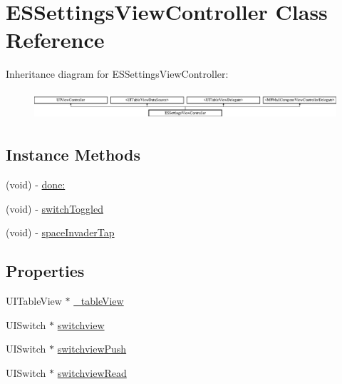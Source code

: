 \hypertarget{interface_e_s_settings_view_controller}{}\section{E\+S\+Settings\+View\+Controller Class Reference}
\label{interface_e_s_settings_view_controller}
Inheritance diagram for E\+S\+Settings\+View\+Controller\+:\begin{figure}[H]
\begin{center}
\leavevmode
\includegraphics[height=1.064639cm]{interface_e_s_settings_view_controller}
\end{center}
\end{figure}
\subsection*{Instance Methods}
\begin{DoxyCompactItemize}
\item 
(void) -\/ \hyperlink{interface_e_s_settings_view_controller_a30793c013a360b7dcf40f73b6bdc7280}{done\+:}
\item 
(void) -\/ \hyperlink{interface_e_s_settings_view_controller_a4fccfa4a432eb8bb7e1ab742fa2c1a76}{switch\+Toggled}
\item 
(void) -\/ \hyperlink{interface_e_s_settings_view_controller_ab755c8271ec77eb3a2de6d08263e1a91}{space\+Invader\+Tap}
\end{DoxyCompactItemize}
\subsection*{Properties}
\begin{DoxyCompactItemize}
\item 
U\+I\+Table\+View $\ast$ \hyperlink{interface_e_s_settings_view_controller_a9aa0e644ccdf077d393ddb21587c709f}{\+\_\+table\+View}
\item 
U\+I\+Switch $\ast$ \hyperlink{interface_e_s_settings_view_controller_a9d4ea83398ad29c745f6978112915031}{switchview}
\item 
U\+I\+Switch $\ast$ \hyperlink{interface_e_s_settings_view_controller_ac40e0b1b19946860c595d06c7d9785d4}{switchview\+Push}
\item 
U\+I\+Switch $\ast$ \hyperlink{interface_e_s_settings_view_controller_a58f2451a126bb78283fe7db9e55a4e6f}{switchview\+Read}
\end{DoxyCompactItemize}


